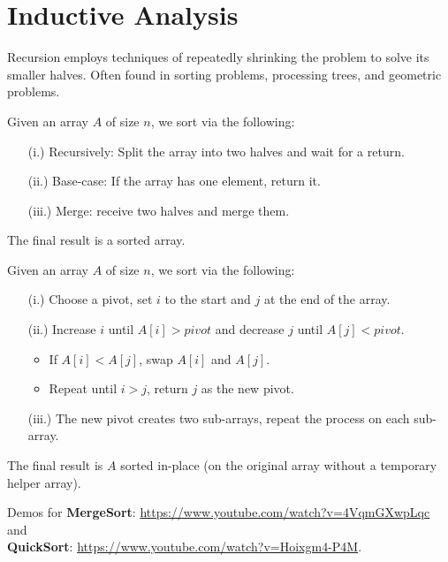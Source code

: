 \vspace{-2em}
\section{Inductive Analysis}

Recursion employs techniques of repeatedly shrinking the problem to solve its smaller halves. Often found in sorting problems, processing trees, and
geometric problems.

\begin{theo}[MergeSort]
    
    Given an array $A$ of size $n$, we sort via the following:
    \begin{enumerate}
        \item [(i.)] Recursively: Split the array into two halves and wait for a return.
        \item [(ii.)] Base-case: If the array has one element, return it.
        \item [(iii.)] Merge: receive two halves and merge them.
    \end{enumerate}
    The final result is a sorted array.
\end{theo}

\begin{theo}[QuickSort]

    Given an array $A$ of size $n$, we sort via the following:
    \begin{enumerate}
        \item [(i.)] Choose a pivot, set $i$ to the start and $j$ at the end of the array.
        \item [(ii.)] Increase $i$ until $A[i]>pivot$ and decrease $j$ until $A[j]<pivot$.
        \begin{itemize}
            \item If $A[i]<A[j]$, swap $A[i]$ and $A[j]$.
            \item Repeat until $i>j$, return $j$ as the new pivot.
        \end{itemize}
        \item [(iii.)] The new pivot creates two sub-arrays, repeat the process on each sub-array.
    \end{enumerate}
    The final result is $A$ sorted in-place (on the original array without a temporary helper array).
\end{theo}

\begin{Tip} Demos for 
 \textbf{MergeSort}: \url{https://www.youtube.com/watch?v=4VqmGXwpLqc} and\\
 \textbf{QuickSort}: \url{https://www.youtube.com/watch?v=Hoixgm4-P4M}.
\end{Tip}

